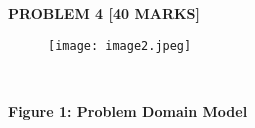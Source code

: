 \documentclass[12pt]{article}
\begin{document}
\vspace{\baselineskip}

\vspace{\baselineskip}
\begin{justify}
\textbf{PROBLEM 4 [40 MARKS]}
\end{justify}\par


\vspace{\baselineskip}

\vspace{\baselineskip}



\begin{figure}[H]
	\begin{Center}
		\texttt{[image: image2.jpeg]}
	\end{Center}
\end{figure}



\begin{justify}
\textbf{\  }
\end{justify}\par


\vspace{\baselineskip}
\begin{Center}
\textbf{Figure 1: Problem Domain Model}
\end{Center}\par


\vspace{\baselineskip}

\vspace{\baselineskip}

\vspace{\baselineskip}

\vspace{\baselineskip}

\vspace{\baselineskip}

\vspace{\baselineskip}

\vspace{\baselineskip}

\vspace{\baselineskip}

\vspace{\baselineskip}

\vspace{\baselineskip}
\end{document}
